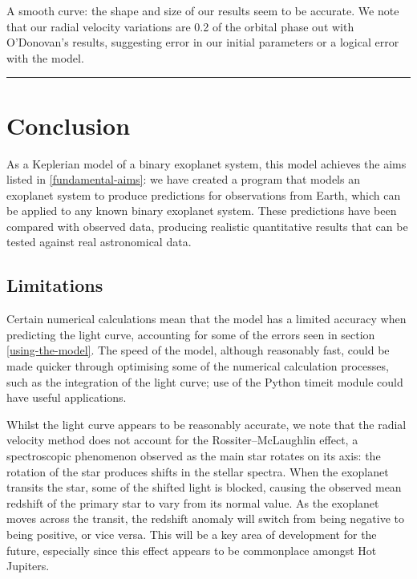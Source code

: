 \documentclass[11pt]{article}
\begin{document}
A smooth curve: the shape and size of our results seem to be accurate.
We note that our radial velocity variations are 0.2 of the orbital phase
out with O'Donovan's results, suggesting error in our initial parameters
or a logical error with the model.

\begin{center}\rule{0.5\linewidth}{0.5pt}\end{center}

    \hypertarget{conclusion}{%
\section{Conclusion}\label{conclusion}}



As a Keplerian model of a binary exoplanet system, this model achieves
the aims listed in \ref{fundamental-aims}: we have created a program that models an exoplanet system to produce predictions for observations from Earth, which can be applied to any known binary exoplanet system. These predictions have been compared with observed data, producing realistic quantitative results that can be tested against real astronomical data.

\hypertarget{limitations}{%
\subsection{Limitations}\label{limitations}}

Certain numerical calculations mean that the model has a limited
accuracy when predicting the light curve, accounting for some of the
errors seen in section \ref{using-the-model}. The speed of the model, although reasonably fast, could be made quicker through optimising some of the numerical
calculation processes, such as the integration of the light curve; use of the Python timeit module could have useful applications.

Whilst the light curve appears to be reasonably accurate, we note that
the radial velocity method does not account for the Rossiter--McLaughlin
effect, a spectroscopic phenomenon observed as the main star rotates on
its axis: the rotation of the star produces shifts in the stellar
spectra. When the exoplanet transits the star, some of the shifted light
is blocked, causing the observed mean redshift of the primary star to
vary from its normal value. As the exoplanet moves across the transit,
the redshift anomaly will switch from being negative to being positive,
or vice versa. This will be a key area of development for the future,
especially since this effect appears to be commonplace amongst Hot
Jupiters.
\end{document}
